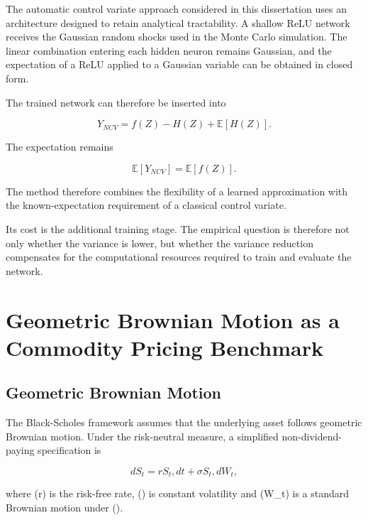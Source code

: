 \documentclass[12pt,a4paper]{report}
\begin{document}
The automatic control variate approach considered in this dissertation uses an architecture designed to retain analytical tractability. A shallow ReLU network receives the Gaussian random shocks used in the Monte Carlo simulation. The linear combination entering each hidden neuron remains Gaussian, and the expectation of a ReLU applied to a Gaussian variable can be obtained in closed form.

The trained network can therefore be inserted into

\begin{equation}
Y_{NCV}
=
f(Z)
-
H(Z)
+
\mathbb{E}[H(Z)].
\end{equation}

The expectation remains

\begin{equation}
\mathbb{E}[Y_{NCV}]
=
\mathbb{E}[f(Z)].
\end{equation}

The method therefore combines the flexibility of a learned approximation with the known-expectation requirement of a classical control variate.

Its cost is the additional training stage. The empirical question is therefore not only whether the variance is lower, but whether the variance reduction compensates for the computational resources required to train and evaluate the network.


\chapter{Geometric Brownian Motion as a Commodity Pricing Benchmark}

\section{Geometric Brownian Motion}

The Black-Scholes framework assumes that the underlying asset follows geometric Brownian motion. Under the risk-neutral measure, a simplified non-dividend-paying specification is

\begin{equation}
dS_t
=
rS_t,dt
+
\sigma S_t,dW_t,
\end{equation}

where (r) is the risk-free rate, (\sigma) is constant volatility and (W_t) is a standard Brownian motion under ().
\end{document}
